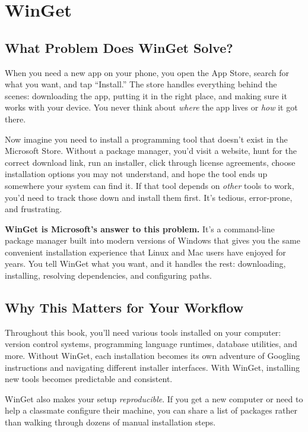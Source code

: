 \documentclass[
  letterpaper,
  DIV=11,
  numbers=noendperiod]{scrreprt}
\begin{document}
\chapter{WinGet}\label{winget}

\section{What Problem Does WinGet
Solve?}\label{what-problem-does-winget-solve}

When you need a new app on your phone, you open the App Store, search
for what you want, and tap ``Install.'' The store handles everything
behind the scenes: downloading the app, putting it in the right place,
and making sure it works with your device. You never think about
\emph{where} the app lives or \emph{how} it got there.

Now imagine you need to install a programming tool that doesn't exist in
the Microsoft Store. Without a package manager, you'd visit a website,
hunt for the correct download link, run an installer, click through
license agreements, choose installation options you may not understand,
and hope the tool ends up somewhere your system can find it. If that
tool depends on \emph{other} tools to work, you'd need to track those
down and install them first. It's tedious, error-prone, and frustrating.

\textbf{WinGet is Microsoft's answer to this problem.} It's a
command-line package manager built into modern versions of Windows that
gives you the same convenient installation experience that Linux and Mac
users have enjoyed for years. You tell WinGet what you want, and it
handles the rest: downloading, installing, resolving dependencies, and
configuring paths.

\section{Why This Matters for Your
Workflow}\label{why-this-matters-for-your-workflow-1}

Throughout this book, you'll need various tools installed on your
computer: version control systems, programming language runtimes,
database utilities, and more. Without WinGet, each installation becomes
its own adventure of Googling instructions and navigating different
installer interfaces. With WinGet, installing new tools becomes
predictable and consistent.

WinGet also makes your setup \emph{reproducible}. If you get a new
computer or need to help a classmate configure their machine, you can
share a list of packages rather than walking through dozens of manual
installation steps.
\end{document}

